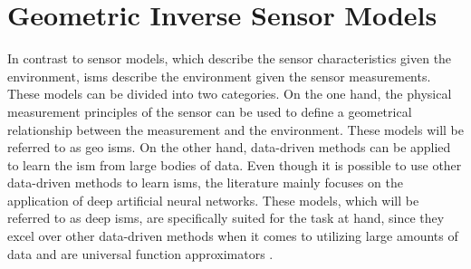 \section{Geometric Inverse Sensor Models}
\label{sec:geo_ism}
In contrast to sensor models, which describe the sensor characteristics given the environment, \gls{ism}s describe the environment given the sensor measurements. These models can be divided into two categories. On the one hand, the physical measurement principles of the sensor can be used to define a geometrical relationship between the measurement and the environment. These models will be referred to as geo \gls{ism}s. On the other hand, data-driven methods can be applied to learn the \gls{ism} from large bodies of data. Even though it is possible to use other data-driven methods to learn \gls{ism}s, the literature mainly focuses on the application of deep artificial neural networks. These models, which will be referred to as deep \gls{ism}s, are specifically suited for the task at hand, since they excel over other data-driven methods when it comes to utilizing large amounts of data \cite{zhou2014big} and are universal function approximators \cite{hornik1991approximation}.
%
